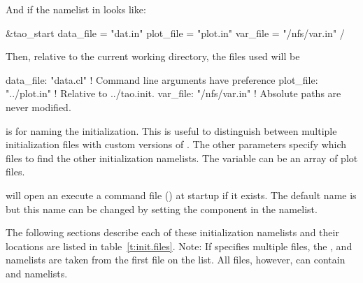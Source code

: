 And if the  namelist in  looks like:
\begin{example}
  &tao_start
    data_file = "dat.in"
    plot_file = "plot.in"
    var_file  = "/nfs/var.in"
  /
\end{example}
Then, relative to the current working directory, the files used will be
\begin{example}
  data_file: "data.cl"      ! Command line arguments have preference
  plot_file: "../plot.in"   ! Relative to ../tao.init.
  var_file:  "/nfs/var.in"  ! Absolute paths are never modified.
\end{example}

 is for naming the initialization. This is useful to distinguish between multiple
initialization files with custom versions of \tao. The other parameters specify which files to find
the other initialization namelists. The  variable can be an array of plot files.

\tao will open an execute a command file () at startup if it exists.  The
default name is  but this name can be changed by setting the 
component in the  namelist.

The following sections describe each of these initialization namelists and their locations are
listed in table~\ref{t:init.files}. Note: If  specifies multiple files, the
,  and  namelists are taken from the
first file on the list. All files, however, can contain  and
 namelists.

